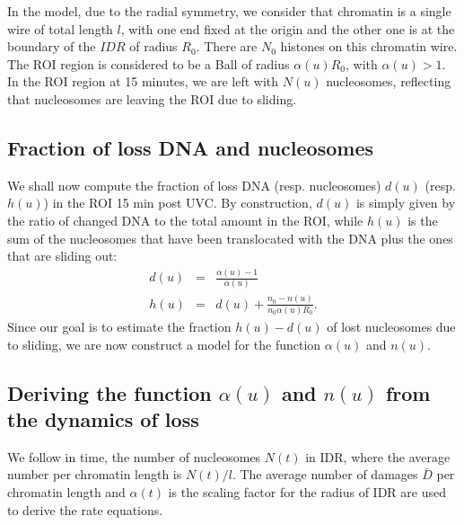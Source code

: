 \documentclass[12pt]{article}
\newcommand{\beq}{\begin{eqnarray}}
\newcommand{\eeq}{\end{eqnarray}}
\begin{document}
In the model, due to the radial symmetry, we consider that chromatin is a single wire of total length $l$, with one end fixed at the origin and the other one is at the boundary of the $IDR$ of radius $R_0$. There are $N_0$ histones on this chromatin wire.  The ROI region is considered to be a Ball of radius $\alpha(u) R_0$, with  $\alpha(u)>1$. In the ROI region at 15 minutes, we are left with $N(u)$ nucleosomes, reflecting that nucleosomes are leaving the ROI due to sliding.
\subsection{Fraction of loss DNA and nucleosomes }
We shall now compute the fraction of loss DNA (resp. nucleosomes) $d(u)$ (resp. $h(u)$) in the ROI 15 min post UVC. By construction, $d(u)$ is simply given by the ratio of changed DNA to the total amount in the ROI, while $h(u)$ is the sum of the nucleosomes that have been translocated with the DNA plus the ones that are sliding out:
\beq
d(u)&=& \frac{\alpha(u) -1}{\alpha(u)} \\
h(u)&=&d(u)+\frac{n_0-n(u)}{n_0 \alpha(u) R_0}.
\eeq
Since our goal is to estimate the fraction $h(u)-d(u)$ of lost nucleosomes due to sliding, we are now construct a model for the function $\alpha(u)$ and $n(u)$.
\subsection{Deriving the function $\alpha(u)$ and $n(u)$ from the dynamics of loss}
We follow in time, the number of nucleosomes $N(t)$ in IDR, where the average number per chromatin length is $N(t)/l$. The average number of damages $\bar{D}$ per chromatin length and $\alpha(t)$ is the scaling factor for the radius of IDR are used to derive the rate equations.
\end{document}
